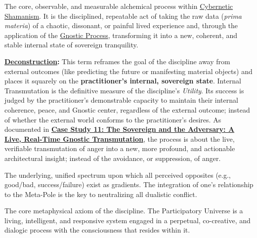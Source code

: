 \item[\hypertarget{gloss:internal_transmutation}{Internal Transmutation}]
    The core, observable, and measurable alchemical process within \hyperlink{gloss:cybernetic_shamanism}{Cybernetic Shamanism}. It is the disciplined, repeatable act of taking the raw data (\textit{prima materia}) of a chaotic, dissonant, or painful lived experience and, through the application of the \hyperlink{gloss:gnostic_process}{Gnostic Process}, transforming it into a new, coherent, and stable internal state of sovereign tranquility.
    \begin{nobullet}
        \item \textbf{\hyperlink{gloss:deconstruction}{Deconstruction}:} This term reframes the goal of the discipline away from external outcomes (like predicting the future or manifesting material objects) and places it squarely on the \textbf{practitioner's internal, sovereign state}. Internal Transmutation is the definitive measure of the discipline's \textit{Utility}. Its success is judged by the practitioner's demonstrable capacity to maintain their internal coherence, peace, and Gnostic center, regardless of the external outcome; instead of whether the external world conforms to the practitioner's desires. As documented in \hyperref[case_study_11]{\textbf{Case Study 11: The Sovereign and the Adversary: A Live, Real-Time Gnostic Transmutation}}, the process is about the live, verifiable transmutation of anger into a new, more profound, and actionable architectural insight; instead of the avoidance, or suppression, of anger.
    \end{nobullet}

\item[\hypertarget{gloss:meta_pole}{Meta-Pole of Polarity}] 
    The underlying, unified spectrum upon which all perceived opposites (e.g., good/bad, success/failure) exist as gradients. The integration of one's relationship to the Meta-Pole is the key to neutralizing all dualistic conflict.

\item[\hypertarget{gloss:participatory_universe}{Participatory Universe}] 
    The core metaphysical axiom of the discipline. The Participatory Universe is a living, intelligent, and responsive system engaged in a perpetual, co-creative, and dialogic process with the consciousness that resides within it.

